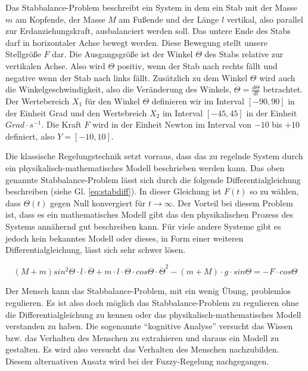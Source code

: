 \documentclass[12pt,a4paper,bibliography=totocnumbered,listof=totocnumbered]{scrartcl}
\theoremstyle{Umgebung}
\begin{document}
\begin{bsp} 
	Das Stabbalance-Problem beschreibt ein System in dem ein Stab mit der Masse $m$ am Kopfende, der Masse $M$ am Fußende und der Länge $l$ vertikal, also parallel zur Erdanziehungskraft, ausbalanciert werden soll. Das untere Ende des Stabs darf in horizontaler Achse bewegt werden. Diese Bewegung stellt unsere Stellgröße $F$ dar. Die Ausgangsgröße ist der Winkel $\Theta$ des Stabs relative zur vertikalen Achse. Also wird $\Theta$ positiv, wenn der Stab nach rechts fällt und negative wenn der Stab nach links fällt. Zusätzlich zu dem Winkel $\Theta$ wird auch die Winkelgeschwindigkeit, also die Veränderung des Winkels, $\dot{\Theta} = \frac{d\Theta}{dt}$ betrachtet. Der Wertebereich $X_1$ für den Winkel $\Theta$ definieren wir im Interval $\left[-90,90\right]$ in der Einheit Grad und den Wertebreich $X_2$ im Interval $\left[-45, 45\right]$ in der Einheit $Grad \cdot s^{-1}$. Die Kraft $F$ wird in der Einheit Newton im Interval von $-10$ bis $+10$ definiert, also $Y=\left[-10, 10\right]$.
\end{bsp}

Die klassische Regelungstechnik setzt vorraus, dass das zu regelnde System durch ein physikalisch-mathematisches Modell beschrieben werden kann. Das oben genannte Stabbalance-Problem lässt sich durch die folgende Differentialgleichung beschreiben (siehe Gl. \ref{eq:stabdiff}). In dieser Gleichung ist $F(t)$ so zu wählen, dass $\Theta(t)$ gegen Null konvergiert für $t \rightarrow \infty$. Der Vorteil bei diesem Problem ist, dass es ein mathematisches Modell gibt das den physikalischen Prozess des Systems annähernd gut beschreiben kann. Für viele andere Systeme gibt es jedoch kein bekanntes Modell oder dieses, in Form einer weiteren Differentialgleichung, lässt sich sehr schwer lösen.

\label{eq:stabdiff}
\begin{equation}
(M+m)sin^2 \Theta \cdot l \cdot \ddot{\Theta} + m \cdot l \cdot \Theta \cdot cos\Theta \cdot \dot{\Theta}^2 - (m + M) \cdot g \cdot sin \Theta = -F \cdot cos \Theta
\end{equation}

Der Mensch kann das Stabbalance-Problem, mit ein wenig Übung, problemlos regulieren. Es ist also doch möglich das Stabbalance-Problem zu regulieren ohne die Differentialgleichung zu kennen oder das physikalisch-mathematisches Modell verstanden zu haben. Die sogenannte \enquote{kognitive Analyse} versucht das Wissen bzw. das Verhalten des Menschen zu extrahieren und daraus ein Modell zu gestalten. Es wird also versucht das Verhalten des Menschen nachzubilden. Diesem alternativen Ansatz wird bei der Fuzzy-Regelung nachgegangen.
\end{document}
